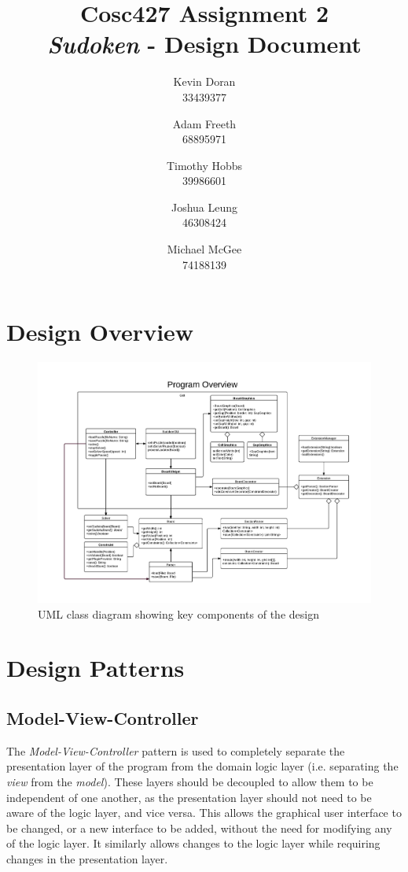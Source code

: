 \documentclass[a4paper, 11pt]{article}
\title{\textbf{Cosc427 Assignment 2} \\ {\textit{Sudoken} - Design Document}}
\author{
	Kevin Doran    \\ 33439377 \and
	Adam Freeth    \\ 68895971 \and
	Timothy Hobbs  \\ 39986601 \and
	Joshua Leung   \\ 46308424 \and
	Michael McGee  \\ 74188139
}
\begin{document}
\maketitle


\section{Design Overview}
\begin{figure}[h]
\includegraphics[scale=0.6]{FrameworkOverview.pdf}
\caption{UML class diagram showing key components of the design}
\end{figure}

\section{Design Patterns}

\subsection{Model-View-Controller}

The \textit{Model-View-Controller} pattern is used to completely separate the presentation layer of the program from the domain logic layer (i.e. separating the \textit{view} from the \textit{model}). These layers should be decoupled to allow them to be independent of one another, as the presentation layer should not need to be aware of the logic layer, and vice versa. This allows the graphical user interface to be changed, or a new interface to be added, without the need for modifying any of the logic layer. It similarly allows changes to the logic layer while requiring changes in the presentation layer.
\end{document}
